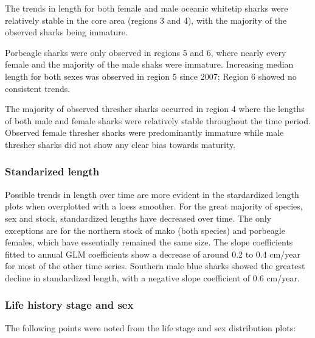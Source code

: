 \documentclass[12pt]{SCreport}
\begin{document}
The trends in length for both female and male oceanic whitetip sharks were relatively stable in the core area (regions 3 and 4),  with the majority of the observed sharks being immature.  

Porbeagle sharks were only observed in regions 5 and 6, where nearly every female and the majority of the male shaks were immature.  Increasing median length for both sexes was observed in region 5 since 2007; Region 6 showed no consistent trends.

The majority of observed thresher sharks occurred in region 4 where the lengths of both male and female sharks were relatively stable throughout the time period. Observed female thresher sharks were predominantly immature while male thresher sharks did not show any clear bias towards maturity.

\subsubsection{Standarized length}
Possible trends in length over time are more evident in the stardardized length plots when overplotted with a loess smoother.  For the great majority of species, sex and stock, standardized lengths have decreased over time.  The only exceptions are for the northern stock of mako (both species) and porbeagle females, which have essentially remained the same size.  The slope coefficients fitted to annual GLM coefficients show a decrease of around 0.2 to 0.4 cm/year for most of the other time series.  Southern male blue sharks showed the greatest decline in standardized length, with a negative slope coefficient of 0.6 cm/year.

\subsubsection{Life history stage and sex}
The following points were noted from the life stage and sex distribution plots:
\end{document}
